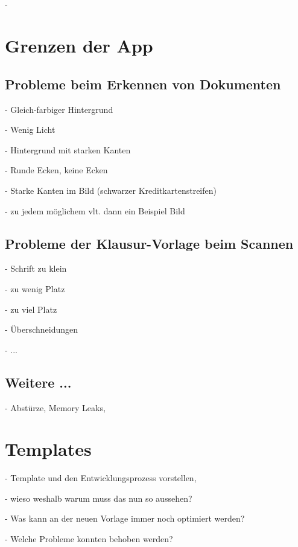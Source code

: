 \documentclass[nomenclature, oneside, 150]{HSMW-Thesis}
\begin{document}
	\section{}
		- 

\chapter{Grenzen der App}
	\section{Probleme beim Erkennen von Dokumenten}
		- Gleich-farbiger Hintergrund
			
		- Wenig Licht
		
		- Hintergrund mit starken Kanten
		
		- Runde Ecken, keine Ecken
		
		- Starke Kanten im Bild (schwarzer Kreditkartenstreifen)
		
		- zu jedem möglichem vlt. dann ein Beispiel Bild
		
	\section{Probleme der Klausur-Vorlage beim Scannen}
		- Schrift zu klein
		
		- zu wenig Platz
		
		- zu viel Platz
		
		- Überschneidungen
		
		- ...
		
	\section{Weitere ...}
		- Abstürze, Memory Leaks, 




\chapter{Templates}
	- Template und den Entwicklungsprozess vorstellen, 
	
	- wieso weshalb warum muss das nun so aussehen?
	
	- Was kann an der neuen Vorlage immer noch optimiert werden?	
	
	- Welche Probleme konnten behoben werden?
	
		
\end{document}
